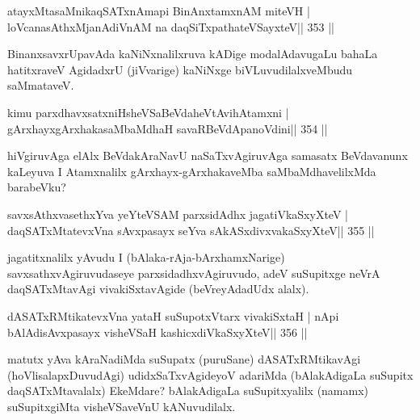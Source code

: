 
\begin{shl}
atayxMtasaMnikaqSATxnAmapi BinAnxtamxnAM miteVH |
loVcanasAthxMjanAdiVnAM na daqSiTxpathateVSayxteV\hfill || 353 ||
\end{shl}

\begin{artha}
BinanxsavxrUpavAda kaNiNxnalilxruva kADige modalAdavugaLu bahaLa  hatitxraveV AgidadxrU (jiVvarige) kaNiNxge biVLuvudilalxveMbudu saMmataveV.
\end{artha}

\begin{shl}
kimu parxdhavxsatxniHsheVSaBeVdaheVtAvihA\s\s tamxni |
gArxhayxgArxhakasaMbaMdhaH savaRBeVdApanoVdini\hfill || 354 ||
\end{shl}

\begin{artha}
hiVgiruvAga elAlx BeVdakAraNavU naSaTxvAgiruvAga samasatx BeVdavanunx kaLeyuva I Atamxnalilx gArxhayx-gArxhakaveMba saMbaMdhavelilxMda barabeVku?
\end{artha}


\begin{shl}
savxsAthxvasethxYva yeYteVSAM parxsidAdhx jagatiVkaSxyXteV |
daqSATxMtatevxVna sAvxpasayx seYva sAkASxdivxvakaSxyXteV\hfill || 355 ||
\end{shl}

\begin{artha}
jagatitxnalilx yAvudu I (bAlaka-rAja-bArxhamxNarige)  savxsathxvAgiruvudaseye parxsidadhxvAgiruvudo, adeV suSupitxge neVrA  daqSATxMtavAgi vivakiSxtavAgide (beVreyAdadUdx alalx).
\end{artha}

\begin{shl}
dASATxRMtikatevxVna yataH suSupotxV\s tarx vivakiSxtaH |
nApi bAlAdisAvxpasayx visheVSaH kashicxdiVkaSxyXteV\hfill || 356 ||
\end{shl}

\begin{artha}
matutx yAva kAraNadiMda suSupatx (puruSane) dASATxRMtikavAgi (hoVlisalapxDuvudAgi) udidxSaTxvAgideyoV adariMda (bAlakAdigaLa suSupitx daqSATxMtavalalx) EkeMdare? bAlakAdigaLa suSupitxyalilx (namamx) suSupitxgiMta visheVSaveVnU kANuvudilalx.
\end{artha}

